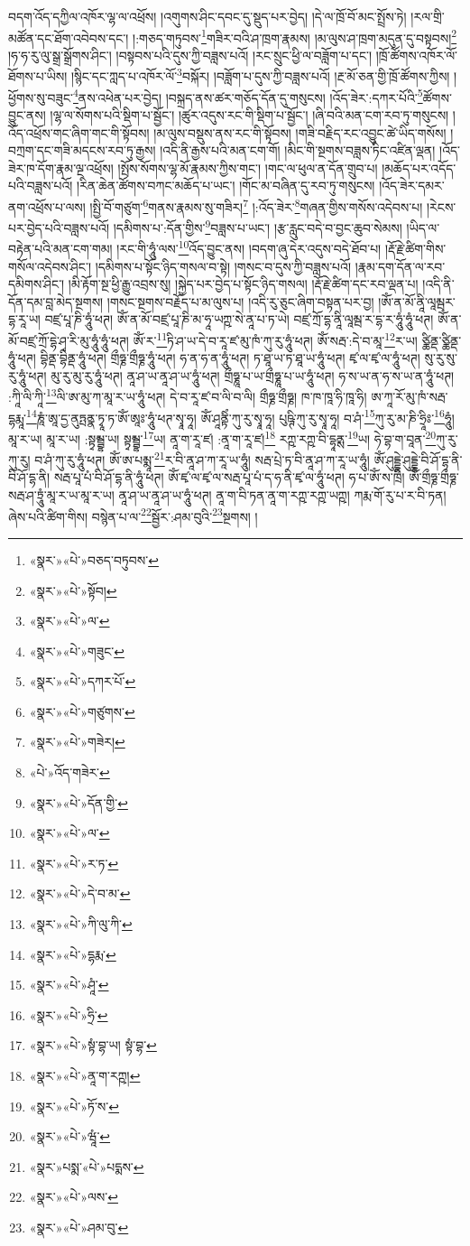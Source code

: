 བདག་འོད་དཀྱིལ་འཁོར་ལྷ་ལ་འཕྲོས། །འགུགས་ཤིང་དབང་དུ་སྡུད་པར་བྱེད། །དེ་ལ་ཁྲོ་བོ་མང་སྤྲོས་ཏེ། །རལ་གྲི་མཚོན་དང་ཐོག་འབེབས་དང་། །:གཅད་གཏུབས་\footnote{«སྣར་»«པེ་»བཅད་བཏུབས་}གཟིར་བའི་ཤ་ཁྲག་རྣམས། །མ་ལུས་ཤ་ཁྲག་མདུན་དུ་བསྟབས།\footnote{«སྣར་»«པེ་»སྟོབ།} །ཧ་ཧ་རུ་ལུ་སྒྲ་སྒྲོགས་ཤིང་། །བསྟབས་པའི་དུས་ཀྱི་བཟླས་པའོ། །རང་སྲུང་ཕྱི་ལ་བཟློག་པ་དང་། །ཁྲོ་ཚོགས་འཁོར་ལོ་ཐོགས་པ་ཡིས། །སྙིང་དང་ཀླད་པ་འཁོར་ལོ་\footnote{«སྣར་»«པེ་»ལ་}བསྐོར། །བཟློག་པ་དུས་ཀྱི་བཟླས་པའོ། །རྔ་མོ་ཅན་གྱི་ཁྲོ་ཚོགས་ཀྱིས། །ཕྱོགས་སུ་བཟུང་\footnote{«སྣར་»«པེ་»གཟུང་}ནས་འཕེན་པར་བྱེད། །བསྐྲད་ནས་ཚར་གཅོད་དོན་དུ་གསུངས། །འོད་ཟེར་:དཀར་པོའི་\footnote{«སྣར་»«པེ་»དཀར་པོ་}ཚོགས་བྱུང་ནས། །ལྷ་ལ་སོགས་པའི་སྡིག་པ་སྦྱོང་། །ཚུར་འདུས་རང་གི་སྡིག་པ་སྦྱོང་། །ཞི་བའི་མན་ངག་རབ་ཏུ་གསུངས། །འོད་འཕྲོས་གང་ཞིག་གང་གི་སྟོབས། །མ་ལུས་བསྡུས་ནས་རང་གི་སྟོབས། །གཟི་བརྗིད་རང་འབྱུང་ཚེ་ཡིད་གསོས། །བཀྲག་དང་གཟི་མདངས་རབ་ཏུ་རྒྱས། །འདི་ནི་རྒྱས་པའི་མན་ངག་གོ། །མིང་གི་སྔགས་བཟླས་ཏིང་འཛིན་ལྡན། །འོད་ཟེར་ཁ་དོག་རྣམ་ལྔ་འཕྲོས། །སྤོས་སོགས་ལྷ་མོ་རྣམས་ཀྱིས་གང་། །གང་ལ་ཕུལ་ན་དོན་གྲུབ་པ། །མཆོད་པར་འདོད་པའི་བཟླས་པའོ། །རིན་ཆེན་ཚོགས་བཀང་མཆོད་པ་ཡང་། །གོང་མ་བཞིན་དུ་རབ་ཏུ་གསུངས། །འོད་ཟེར་དམར་ནག་འཕྲོས་པ་ལས། །སྤྱི་བོ་གཙུག་\footnote{«སྣར་»«པེ་»གཙུགས་}གནས་རྣམས་སུ་གཟིར།\footnote{«སྣར་»«པེ་»གཟེར།} །:འོད་ཟེར་\footnote{«པེ་»འོད་གཟེར་}གཞན་གྱིས་གསོས་འདེབས་པ། །རེངས་པར་བྱེད་པའི་བཟླས་པའོ། །དམིགས་པ་:དོན་གྱིས་\footnote{«སྣར་»«པེ་»དོན་གྱི་}བཟླས་པ་ཡང་། །རྩ་རླུང་བདེ་བ་བྱང་ཆུབ་སེམས། །ཡིད་ལ་བརྟེན་པའི་མན་ངག་གམ། །རང་གི་ཧཱུཾ་ལས་\footnote{«སྣར་»«པེ་»ལ་}འོད་བྱུང་ནས། །བདག་ཞུ་དེར་འདུས་བདེ་ཐོབ་པ། །རྡོ་རྗེ་ཚིག་གིས་གསོལ་འདེབས་ཤིང་། །དམིགས་པ་སྟོང་ཉིད་གསལ་བ་སྟེ། །གསང་བ་དུས་ཀྱི་བཟླས་པའོ། །རྣམ་དག་དོན་ལ་རབ་དམིགས་ཤིང་། །མི་རྟོག་སྔ་ཕྱི་རྒྱུ་འབྲས་སུ། །སྐྱེད་པར་བྱེད་པ་སྟོང་ཉིད་གསལ། །རྡོ་རྗེ་ཚིག་དང་རབ་ལྡན་པ། །འདི་ནི་དོན་དམ་བླ་མེད་སྔགས། །གསང་སྔགས་བརྗོད་པ་མ་ལུས་པ། །འདི་རུ་ཅུང་ཞིག་བསྟན་པར་བྱ། །ཨོཾ་ན་མོ་ནཱི་ལཱམྦར་དྷ་རཱ་ཡ། བཛྲ་པཱ་ཎི་ཧཱུཾ་ཕཊ། ཨོཾ་ན་མོ་བཛྲ་པཱ་ཎི་མ་ཧཱ་ཡཀྵ་སེ་ནཱ་པ་ཏ་ཡེ། བཛྲ་ཀྲོ་དྷ་ནཱི་ལཱམྦ་ར་དྷ་ར་ཧཱུཾ་ཧཱུཾ་ཕཊ། ཨོཾ་ན་མོ་བཛྲ་ཀྲོ་དྷེ་ཤྭ་རི་མུ་ཧཱུཾ་ཧཱུཾ་ཕཊ། ཨོཾ་ར་\footnote{«སྣར་»«པེ་»ར་ཏ་}ཏི་ཤ་ཡ་དེ་བ་རཱ་ཛ་མུ་ཁཾ་ཀུ་རུ་ཧཱུཾ་ཕཊ། ཨོཾ་སརྦ་:དེ་བ་མཱ་\footnote{«སྣར་»«པེ་»དེ་བ་མ་}ར་ཡ། ཙྪིནྡ་ཙྪིནྡ་ཧཱུཾ་ཕཊ། བྷིནྡ་བྷིནྡ་ཧཱུཾ་ཕཊ། གྲྀཧྞ་གྲྀཧྞ་ཧཱུཾ་ཕཊ། ཧ་ན་ཧ་ན་ཧཱུཾ་ཕཊ། ཏ་ཐཱ་ཡ་ཏ་ཐཱ་ཡ་ཧཱུཾ་ཕཊ། ཛྭ་ལ་ཛྭ་ལ་ཧཱུཾ་ཕཊ། སུ་རུ་སུ་རུ་ཧཱུཾ་ཕཊ། མུ་རུ་མུ་རུ་ཧཱུཾ་ཕཊ། ནཱ་ཤ་ཡ་ནཱ་ཤ་ཡ་ཧཱུཾ་ཕཊ། གྲྀཧྞཱ་པ་ཡ་གྲྀཧྞཱ་པ་ཡ་ཧཱུཾ་ཕཊ། ཧ་ས་ཡ་ན་ཧ་ས་ཡ་ན་ཧཱུཾ་ཕཊ། :ཀཱི་ལི་ཀཱི་\footnote{«སྣར་»«པེ་»ཀི་ལུ་ཀི་}ལི་ཨ་མུ་ཀ་མཱ་ར་ཡ་ཧཱུཾ་ཕཊ། དེ་བ་རཱ་ཛ་བ་ལི་བ་ལི། གྲྀཧྞ་གྲྀཧྞ། ཁ་ཁ་ཁཱ་ཧི་ཁཱ་ཧི། ཨ་ཀཱ་རོ་མུ་ཁཾ་སརྦ་དྷརྨཱ་\footnote{«སྣར་»«པེ་»དྷརྨ་}ཎཱཾ་ཨཱ་དྱ་ནུཏྤནྣ་ཏྭཱ་ཏ་ཨོཾ་ཨཱཿ་ཧཱུཾ་ཕཊ་སྭཱ་ཧཱ། ཨོཾ་ཤཱནྟིཾ་ཀུ་རུ་སྭཱ་ཧཱ། པུཥྚི་ཀུ་རུ་སྭཱ་ཧཱ། བ་ཤཾ་\footnote{«སྣར་»«པེ་»ཤཱཾ་}ཀུ་རུ་མ་ཎི་ཧྲཱིཿ་\footnote{«སྣར་»«པེ་»ཧྲི་}ཧཱུཾ། མཱ་ར་ཡ། མཱ་ར་ཡ། :སྟྭམྦྷ་ཡ། སྟྭམྦྷ་\footnote{«སྣར་»«པེ་»སྟཾ་བྷ་ཡ། སྟཾ་བྷ་}ཡ། ནཱ་ག་རཱ་ཛ། :ནཱ་ག་རཱ་ཛ།\footnote{«སྣར་»«པེ་»ནཱ་ག་རཀྵ།} རཀྵ་རཀྵ་བི་དྷཱནྶ་\footnote{«སྣར་»«པེ་»ཏོ་ས་}ཡ། ཧེ་བྷ་ག་བཱན་\footnote{«སྣར་»«པེ་»ཝཱཾ་}ཀུ་རུ་ཀུ་རུ། བ་ཤཾ་ཀུ་རུ་ཧཱུཾ་ཕཊ། ཨོཾ་ཨ་པམྨཱ་\footnote{«སྣར་»པསྨ་«པེ་»པདྨས་}ར་བི་ནཱ་ཤ་ཀ་རཱ་ཡ་ཧཱུཾ། སརྦ་པྲེ་ཏ་བི་ནཱ་ཤ་ཀ་རཱ་ཡ་ཧཱུཾ། ཨོཾ་ཤུདྡྷེ་ཤུདྡྷེ་བི་ཤོ་དྷ་ནི་བི་ཤོ་དྷ་ནི། སརྦ་པཱ་པཾ་བི་ཤོ་དྷ་ནི་ཧཱུཾ་ཕཊ། ཨོཾ་ཛྭ་ལ་ཛྭ་ལ་སརྦ་པཱ་པཾ་ད་ཧ་ནི་ཛྭ་ལ་ཧཱུཾ་ཕཊ། ཧ་པ་ཨོཾ་ས་ཁྲི། ཨོཾ་གྲྀཧྞ་གྲྀཧྞ་སརྦ་ཤ་ཏྲཱུཾ་མཱ་ར་ཡ་མཱ་ར་ཡ། ནཱ་ཤ་ཡ་ནཱ་ཤ་ཡ་ཧཱུཾ་ཕཊ། ནཱ་ག་བི་ཏན་ནཱ་ག་རཀྵ་རཀྵ་ཡཀྵ། ཀརྨ་གོ་རུ་པ་ར་བི་ཏན། ཞེས་པའི་ཚིག་གིས། བསྙེན་པ་ལ་\footnote{«སྣར་»«པེ་»ལས་}སྦྱོར་:ཤམ་བུའི་\footnote{«སྣར་»«པེ་»ཤམ་བུ་}སྔགས། །
